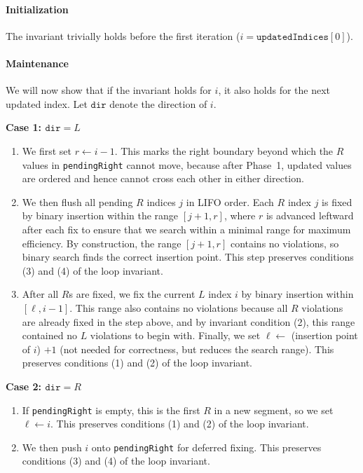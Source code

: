 \paragraph{Initialization} The invariant trivially holds before the first iteration ($i = \texttt{updatedIndices}[0]$).

\paragraph{Maintenance} We will now show that if the invariant holds for $i$, it also holds for the next updated index. Let $\texttt{dir}$ denote the direction of $i$.

\textbf{Case 1: $\texttt{dir} = L$}
\begin{enumerate}
  \item We first set $r \gets i - 1$. This marks the right boundary beyond which the $R$ values in \texttt{pendingRight} cannot move, because after Phase~1, updated values are ordered and hence cannot cross each other in either direction.
  \item We then flush all pending $R$ indices $j$ in LIFO order. Each $R$ index $j$ is fixed by binary insertion within the range $[j+1, r]$, where $r$ is advanced leftward after each fix to ensure that we search within a minimal range for maximum efficiency. By construction, the range $[j+1, r]$ contains no violations, so binary search finds the correct insertion point. This step preserves conditions (3) and (4) of the loop invariant.
  \item After all $R$s are fixed, we fix the current $L$ index $i$ by binary insertion within $[\ell, i-1]$. This range also contains no violations because all $R$ violations are already fixed in the step above, and by invariant condition (2), this range contained no $L$ violations to begin with. Finally, we set $\ell \gets$ (insertion point of $i$) $+ 1$ (not needed for correctness, but reduces the search range). This preserves conditions (1) and (2) of the loop invariant.
\end{enumerate}

\textbf{Case 2: $\texttt{dir} = R$}
\begin{enumerate}
  \item If \texttt{pendingRight} is empty, this is the first $R$ in a new segment, so we set $\ell \gets i$. This preserves conditions (1) and (2) of the loop invariant.
  \item We then push $i$ onto \texttt{pendingRight} for deferred fixing. This preserves conditions (3) and (4) of the loop invariant.
\end{enumerate}

